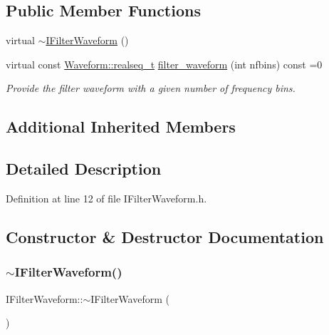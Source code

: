 \subsection*{Public Member Functions}
\begin{DoxyCompactItemize}
\item 
virtual \hyperlink{class_wire_cell_1_1_i_filter_waveform_ac262198f5ce4f74ecb78016919135389}{$\sim$\+I\+Filter\+Waveform} ()
\item 
virtual const \hyperlink{namespace_wire_cell_1_1_waveform_a479175e541c8545e87cd8063b74b6956}{Waveform\+::realseq\+\_\+t} \hyperlink{class_wire_cell_1_1_i_filter_waveform_a7757f5772c9974a6c76bebcc856a3069}{filter\+\_\+waveform} (int nfbins) const =0
\begin{DoxyCompactList}\small\item\em Provide the filter waveform with a given number of frequency bins. \end{DoxyCompactList}\end{DoxyCompactItemize}
\subsection*{Additional Inherited Members}


\subsection{Detailed Description}


Definition at line 12 of file I\+Filter\+Waveform.\+h.



\subsection{Constructor \& Destructor Documentation}
\mbox{\label{class_wire_cell_1_1_i_filter_waveform_ac262198f5ce4f74ecb78016919135389}} 
\subsubsection{\texorpdfstring{$\sim$\+I\+Filter\+Waveform()}{~IFilterWaveform()}}
{\footnotesize\ttfamily I\+Filter\+Waveform\+::$\sim$\+I\+Filter\+Waveform (\begin{DoxyParamCaption}{ }\end{DoxyParamCaption})\hspace{0.3cm}{\ttfamily [virtual]}}



